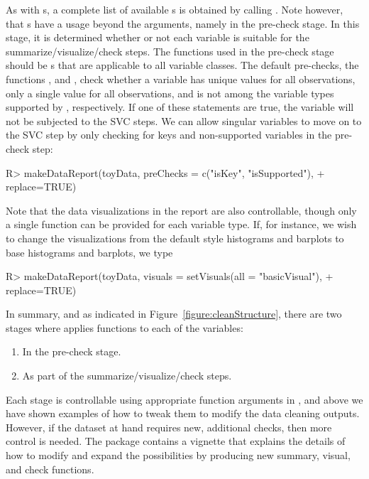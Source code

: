 \documentclass[article,shortnames]{jss}
\begin{document}
As with s, a complete list of available
s is obtained by calling
. Note however, that s have a
usage beyond the  arguments, namely in the
pre-check stage. In this stage, it is determined whether or
not each variable is suitable for the summarize/visualize/check
steps. The functions used in the pre-check stage should be
s that are applicable to all variable classes. The
default pre-checks, the functions ,  and , check
whether a variable has unique values for all observations, only a
single value for all observations, and is not among the variable types supported by , respectively. If one of these
statements are true, the variable will not be subjected to the SVC
steps.  We can allow singular variables to move on to the SVC step by
only checking for keys and non-supported variables in the pre-check step:

\begin{Schunk}
\begin{Sinput}
R> makeDataReport(toyData, preChecks = c("isKey", "isSupported"), 
+    replace=TRUE)
\end{Sinput}
\end{Schunk}

Note that the data visualizations in the report are also
controllable, though only a single function can be provided for each variable type. If, for instance, we wish to change the visualizations
from the default  \citep{ggplot2} style histograms and barplots to base
 histograms and barplots, we type

\begin{Schunk}
\begin{Sinput}
R> makeDataReport(toyData, visuals = setVisuals(all = "basicVisual"), 
+    replace=TRUE)
\end{Sinput}
\end{Schunk}

In summary, and as indicated in Figure~\ref{figure:cleanStructure}, there are two stages
where  applies functions to each of the variables:
\begin{enumerate}
\item In the pre-check stage.
\item As part of the summarize/visualize/check steps.
\end{enumerate}
Each stage is controllable using appropriate function
arguments in , and above we have shown examples
of how to tweak them to modify the data cleaning outputs. However, if
the dataset at hand requires new, additional checks, then more control
is needed. The package contains a vignette that explains the details of how to modify and
expand the possibilities by producing new summary, visual, and check
functions.
\end{document}
